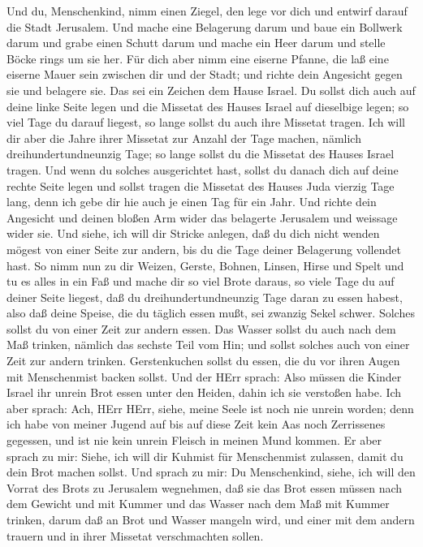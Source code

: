  Und du, Menschenkind, nimm einen Ziegel, den lege vor dich
und entwirf darauf die Stadt Jerusalem.  Und mache eine
Belagerung darum und baue ein Bollwerk darum und grabe einen Schutt
darum und mache ein Heer darum und stelle Böcke rings um sie her.
 Für dich aber nimm eine eiserne Pfanne, die laß eine
eiserne Mauer sein zwischen dir und der Stadt; und richte dein Angesicht
gegen sie und belagere sie. Das sei ein Zeichen dem Hause Israel.
 Du sollst dich auch auf deine linke Seite legen und die
Missetat des Hauses Israel auf dieselbige legen; so viel Tage du darauf
liegest, so lange sollst du auch ihre Missetat tragen.  Ich
will dir aber die Jahre ihrer Missetat zur Anzahl der Tage machen,
nämlich dreihundertundneunzig Tage; so lange sollst du die Missetat des
Hauses Israel tragen.  Und wenn du solches ausgerichtet
hast, sollst du danach dich auf deine rechte Seite legen und sollst
tragen die Missetat des Hauses Juda vierzig Tage lang, denn ich gebe dir
hie auch je einen Tag für ein Jahr.  Und richte dein
Angesicht und deinen bloßen Arm wider das belagerte Jerusalem und
weissage wider sie.  Und siehe, ich will dir Stricke
anlegen, daß du dich nicht wenden mögest von einer Seite zur andern, bis
du die Tage deiner Belagerung vollendet hast.  So nimm nun
zu dir Weizen, Gerste, Bohnen, Linsen, Hirse und Spelt und tu es alles
in ein Faß und mache dir so viel Brote daraus, so viele Tage du auf
deiner Seite liegest, daß du dreihundertundneunzig Tage daran zu essen
habest,  also daß deine Speise, die du täglich essen mußt,
sei zwanzig Sekel schwer. Solches sollst du von einer Zeit zur andern
essen.  Das Wasser sollst du auch nach dem Maß trinken,
nämlich das sechste Teil vom Hin; und sollst solches auch von einer Zeit
zur andern trinken.  Gerstenkuchen sollst du essen, die du
vor ihren Augen mit Menschenmist backen sollst.  Und der
HErr sprach: Also müssen die Kinder Israel ihr unrein Brot essen unter
den Heiden, dahin ich sie verstoßen habe.  Ich aber sprach:
Ach, HErr HErr, siehe, meine Seele ist noch nie unrein worden; denn ich
habe von meiner Jugend auf bis auf diese Zeit kein Aas noch Zerrissenes
gegessen, und ist nie kein unrein Fleisch in meinen Mund kommen.
 Er aber sprach zu mir: Siehe, ich will dir Kuhmist für
Menschenmist zulassen, damit du dein Brot machen sollst. 
Und sprach zu mir: Du Menschenkind, siehe, ich will den Vorrat des Brots
zu Jerusalem wegnehmen, daß sie das Brot essen müssen nach dem Gewicht
und mit Kummer und das Wasser nach dem Maß mit Kummer trinken,
 darum daß an Brot und Wasser mangeln wird, und einer mit
dem andern trauern und in ihrer Missetat verschmachten sollen.

